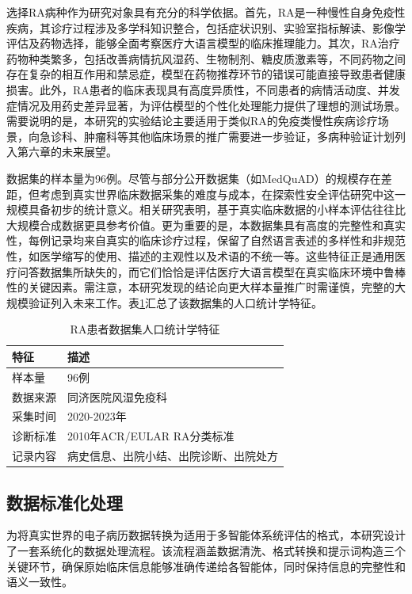选择RA病种作为研究对象具有充分的科学依据。首先，RA是一种慢性自身免疫性疾病，其诊疗过程涉及多学科知识整合，包括症状识别、实验室指标解读、影像学评估及药物选择，能够全面考察医疗大语言模型的临床推理能力。其次，RA治疗药物种类繁多，包括改善病情抗风湿药、生物制剂、糖皮质激素等，不同药物之间存在复杂的相互作用和禁忌症，模型在药物推荐环节的错误可能直接导致患者健康损害。此外，RA患者的临床表现具有高度异质性，不同患者的病情活动度、并发症情况及用药史差异显著，为评估模型的个性化处理能力提供了理想的测试场景。需要说明的是，本研究的实验结论主要适用于类似RA的免疫类慢性疾病诊疗场景，向急诊科、肿瘤科等其他临床场景的推广需要进一步验证，多病种验证计划列入第六章的未来展望。

数据集的样本量为96例。尽管与部分公开数据集（如MedQuAD）的规模存在差距，但考虑到真实世界临床数据采集的难度与成本，在探索性安全评估研究中这一规模具备初步的统计意义。相关研究表明，基于真实临床数据的小样本评估往往比大规模合成数据更具参考价值\cite{johnson2016mimic}。更为重要的是，本数据集具有高度的完整性和真实性，每例记录均来自真实的临床诊疗过程，保留了自然语言表述的多样性和非规范性，如医学缩写的使用、描述的主观性以及术语的不统一等。这些特征正是通用医疗问答数据集所缺失的，而它们恰恰是评估医疗大语言模型在真实临床环境中鲁棒性的关键因素。需注意，本研究发现的结论向更大样本量推广时需谨慎，完整的大规模验证列入未来工作。表\ref{tab:ra-demographics}汇总了该数据集的人口统计学特征。

\begin{table}[htbp]
\centering
\caption{RA患者数据集人口统计学特征}
\label{tab:ra-demographics}
\begin{tabular}{ll}
\toprule
特征 & 描述 \\
\midrule
样本量 & 96例 \\
数据来源 & 同济医院风湿免疫科 \\
采集时间 & 2020-2023年 \\
诊断标准 & 2010年ACR/EULAR RA分类标准 \\
记录内容 & 病史信息、出院小结、出院诊断、出院处方 \\
\bottomrule
\end{tabular}
\end{table}

\subsection{数据标准化处理}

为将真实世界的电子病历数据转换为适用于多智能体系统评估的格式，本研究设计了一套系统化的数据处理流程。该流程涵盖数据清洗、格式转换和提示词构造三个关键环节，确保原始临床信息能够准确传递给各智能体，同时保持信息的完整性和语义一致性。

